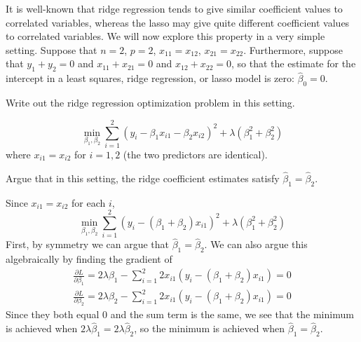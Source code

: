 \documentclass{article}
\begin{document}
\begin{probset}
\newpage

\begin{prob}
    It is well-known that ridge regression tends to give similar coefficient values to correlated variables, whereas the lasso may give quite different coefficient values to correlated variables. We will now explore this property in a very simple setting. Suppose that $n = 2$, $p = 2$, $x_{11} = x_{12}$, $x_{21} = x_{22}$. Furthermore, suppose that $y_1 + y_2 = 0$ and $x_{11} + x_{21} = 0$ and $x_{12} + x_{22} = 0$, so that the estimate for the intercept in a least squares, ridge regression, or lasso model is zero: $\hat{\beta}_0 = 0$.

    \begin{subprobset}
        \begin{subprob}
            Write out the ridge regression optimization problem in this setting.

            \begin{soln}
                \[
                    \min_{\beta_1, \beta_2} \sum_{i=1}^2 (y_i - \beta_1 x_{i1} - \beta_2 x_{i2})^2 + \lambda (\beta_1^2 + \beta_2^2)
                \]
                where $x_{i1} = x_{i2}$ for $i = 1, 2$ (the two predictors are identical).
            \end{soln}
        \end{subprob}

        \begin{subprob}
            Argue that in this setting, the ridge coefficient estimates satisfy $\hat{\beta}_1 = \hat{\beta}_2$.

            \begin{soln}
                Since $x_{i1} = x_{i2}$ for each $i$, 
                \[
                    \min_{\beta_1, \beta_2} \sum_{i=1}^2 (y_i - (\beta_1 + \beta_2)x_{i1})^2 + \lambda (\beta_1^2 + \beta_2^2)
                \]
                First, by symmetry we can argue that $\hat{\beta}_1 = \hat{\beta}_2$. We can also argue this algebraically by finding the gradient of 
                \begin{align*}
                    \frac{\partial L}{\partial \beta_1} = 2\lambda \beta_1 - \sum_{i=1}^2 2x_{i1}(y_i - (\beta_1 + \beta_2)x_{i1}) = 0 \\
                    \frac{\partial L}{\partial \beta_2} = 2\lambda \beta_2 - \sum_{i=1}^2 2x_{i1}(y_i - (\beta_1 + \beta_2)x_{i1}) = 0
                \end{align*}
                Since they both equal 0 and the sum term is the same, we see that the minimum is achieved when $2\lambda\hat{\beta}_1 = 2\lambda\hat{\beta}_2$, so the minimum is achieved when $\hat{\beta}_1 = \hat{\beta}_2$.
            \end{soln}
        \end{subprob}


\end{subprobset}
\end{prob}
\end{probset}
\end{document}
